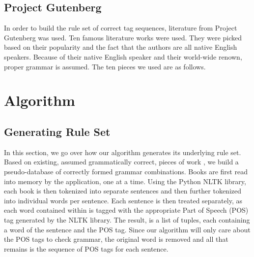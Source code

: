 \documentclass[11pt,a4paper]{article}
\begin{document}
\begin{multicols}{2}
\subsection{Project Gutenberg}
In order to build the rule set of correct tag sequences, literature from Project Gutenberg was used. \cite{gutenberg} Ten famous literature works were used. They were picked based on their popularity and the fact that the authors are all native English speakers. Because of their native English speaker and their world-wide renown, proper grammar is assumed. The ten pieces we used are as follows.



\section{Algorithm}


\subsection{Generating Rule Set}

In this section, we go over how our algorithm generates its underlying rule set. Based on existing, assumed grammatically correct, pieces of work \cite{gutenberg}, we build a pseudo-database of correctly formed grammar combinations. Books are first read into memory by the application, one at a time. Using the Python NLTK library, each book is then tokenized into separate sentences and then further tokenized into individual words per sentence. Each sentence is then treated separately, as each word contained within is tagged with the appropriate Part of Speech (POS) tag generated by the NLTK library. The result, is a list of tuples, each containing a word of the sentence and the POS tag. Since our algorithm will only care about the POS tags to check grammar, the original word is removed and all that remains is the sequence of POS tags for each sentence. 


\end{multicols}
\end{document}
